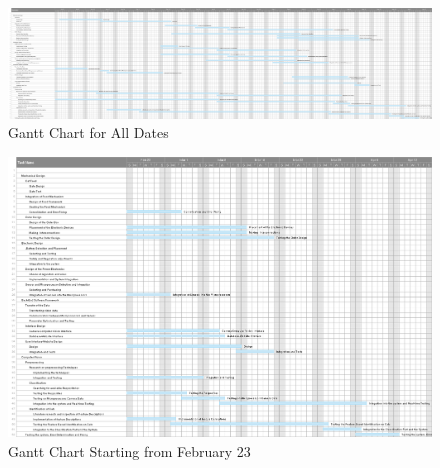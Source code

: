 

\begin{appendices}

\end{appendices}

\begin{figure}[ht]
     \centering
     \includegraphics[width=\linewidth]{content/990_appendix/GanttChart.png}
     \caption{Gantt Chart for All Dates}
     \label{fig:GanttAllDates}
\end{figure}

\begin{figure}[ht]
     \centering
     \includegraphics[width=\linewidth]{content/990_appendix/GanttChartToday.png}
     \caption{Gantt Chart Starting from February 23}
     \label{fig:GanttToday}
\end{figure}